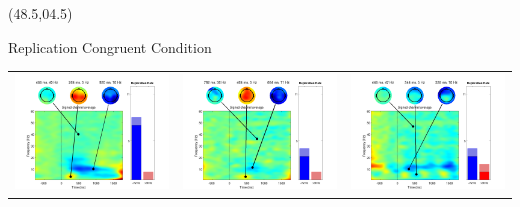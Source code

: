 \documentclass[final]{beamer}
\begin{document}
\begin{frame}{}
\begin{textblock}{67}(48.5,04.5)
\begin{block}{Replication}
\centering
Congruent Condition
\small
\begin{tabular}{c c c}
\includegraphics{gamma01} & \includegraphics{gamma02} & \includegraphics{gamma03} \\

\end{tabular}
\end{block}
\end{textblock}
\end{frame}
\end{document}
